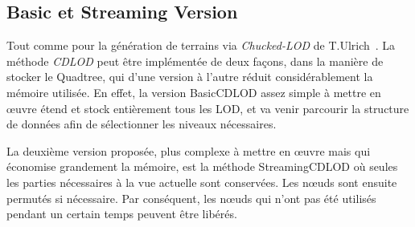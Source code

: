 \subsection{Basic et Streaming Version}

    Tout comme pour la génération de terrains via \emph{Chucked-LOD} de T.Ulrich~\cite{CLOD}. La méthode \emph{CDLOD} peut être implémentée de deux façons, dans la manière de stocker le Quadtree, qui d'une version à l'autre réduit considérablement la mémoire utilisée. En effet, la version BasicCDLOD assez simple à mettre en \oe{}uvre étend et stock entièrement tous les LOD, et va venir parcourir la structure de données afin de sélectionner les niveaux nécessaires.
   
   La deuxième version proposée, plus complexe à mettre en \oe{}uvre mais qui économise grandement la mémoire, est la méthode StreamingCDLOD où seules les parties nécessaires à la vue actuelle sont conservées. Les n\oe{}uds sont ensuite permutés si nécessaire. Par conséquent, les n\oe{}uds qui n'ont pas été utilisés pendant un certain temps peuvent être libérés.